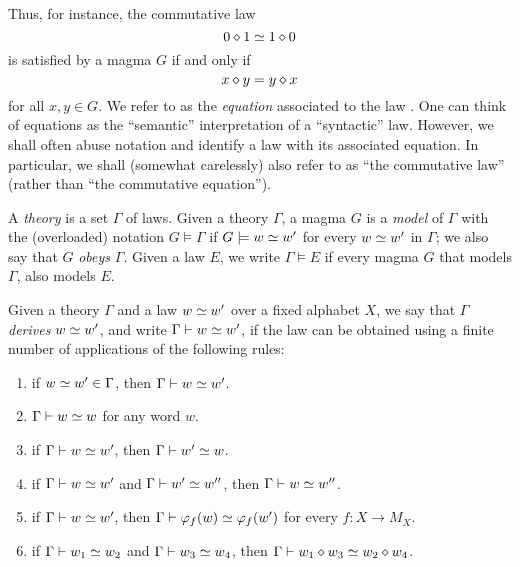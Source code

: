 Thus, for instance, the commutative law
\begin{equation}\label{comm-law}
  0 \diamond 1 \simeq 1 \diamond 0
\end{equation}
is satisfied by a magma $G$ if and only if
\begin{equation}\label{comm-law-2}
 x \diamond y = y \diamond x
\end{equation}
for all $x, y \in G$. We refer to  as the \emph{equation} associated to the law . One can think of equations as the ``semantic'' interpretation of a ``syntactic'' law. However, we shall often abuse notation and identify a law with its associated equation. In particular, we shall (somewhat carelessly) also refer to  as ``the commutative law'' (rather than ``the commutative equation'').

\begin{definition}[Models]\label{models-def}
  \leanok
  A \emph{theory} is a set $\Gamma$ of laws.
  Given a theory $\Gamma$, a magma $G$ is a \emph{model} of $\Gamma$ with the
  (overloaded) notation $G\models\Gamma$ if $G\models w\simeq w'$ for every $w\simeq w'$ in $\Gamma$; we also say that $G$ \emph{obeys} $\Gamma$.
  Given a law $E$, we write $\Gamma \models E$ if every magma $G$ that models $\Gamma$, also models $E$.
\end{definition}

\begin{definition}[Derivation]\label{derivation-def}
  \leanok
  Given a theory $\Gamma$ and a law $w\simeq w'$ over a fixed alphabet $X$, we say that
  $\Gamma$ \emph{derives} $w\simeq w'$, and write $\Gamma\vdash w\simeq w'$, if the law can
  be obtained using a finite number of applications of the following rules:
  \begin{enumerate}
    \item if $w\simeq w' \in \Gamma$, then $\Gamma\vdash w\simeq w'$.
    \item $\Gamma\vdash w\simeq w$ for any word $w$.
    \item if $\Gamma\vdash w\simeq w'$, then $\Gamma\vdash w'\simeq w$.
    \item if $\Gamma\vdash w\simeq w'$ and $\Gamma\vdash w'\simeq w''$, then $\Gamma\vdash w\simeq w''$.
    \item if $\Gamma\vdash w\simeq w'$, then $\Gamma\vdash \varphi_f(w) \simeq \varphi_f(w')$ for every $f: X \to M_X$.
    \item if $\Gamma\vdash w_1\simeq w_2$ and $\Gamma\vdash w_3\simeq w_4$, then $\Gamma\vdash w_1 \diamond w_3\simeq w_2\diamond w_4$.
  \end{enumerate}
\end{definition}

